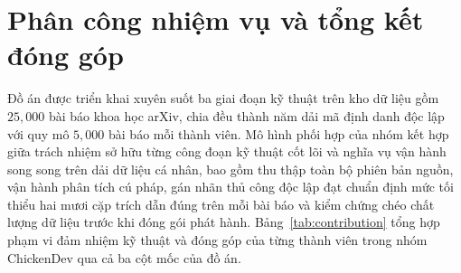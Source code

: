 \section{Phân công nhiệm vụ và tổng kết đóng góp}

Đồ án được triển khai xuyên suốt ba giai đoạn kỹ thuật trên kho dữ liệu gồm $25{,}000$ bài báo khoa học arXiv, chia đều thành năm dải mã định danh độc lập với quy mô $5{,}000$ bài báo mỗi thành viên. Mô hình phối hợp của nhóm kết hợp giữa trách nhiệm sở hữu từng công đoạn kỹ thuật cốt lõi và nghĩa vụ vận hành song song trên dải dữ liệu cá nhân, bao gồm thu thập toàn bộ phiên bản nguồn, vận hành phân tích cú pháp, gán nhãn thủ công độc lập đạt chuẩn định mức tối thiểu hai mươi cặp trích dẫn đúng trên mỗi bài báo và kiểm chứng chéo chất lượng dữ liệu trước khi đóng gói phát hành. Bảng~\ref{tab:contribution} tổng hợp phạm vi đảm nhiệm kỹ thuật và đóng góp của từng thành viên trong nhóm ChickenDev qua cả ba cột mốc của đồ án.

